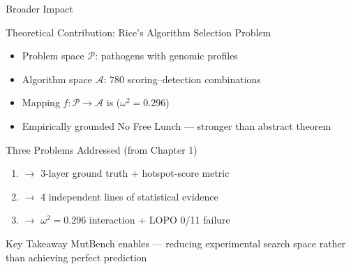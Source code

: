 \begin{frame}{Broader Impact}
  \begin{block}{Theoretical Contribution: Rice's Algorithm Selection Problem}
    \begin{itemize}
      \item Problem space $\mathcal{P}$: pathogens with genomic profiles
      \item Algorithm space $\mathcal{A}$: 780 scoring--detection combinations
      \item Mapping $f: \mathcal{P} \to \mathcal{A}$ is  ($\omega^2 = 0.296$)
      \item Empirically grounded No Free Lunch --- stronger than abstract theorem
    \end{itemize}
  \end{block}

  \begin{block}{Three Problems Addressed (from Chapter 1)}
    \begin{enumerate}
      \item {} $\to$ 3-layer ground truth + hotspot-score metric
      \item {} $\to$ 4 independent lines of statistical evidence
      \item {} $\to$ $\omega^2 = 0.296$ interaction + LOPO 0/11 failure
    \end{enumerate}
  \end{block}

  \begin{block}{Key Takeaway}
    MutBench enables  ---
    reducing experimental search space rather than achieving perfect prediction
  \end{block}
\end{frame}
